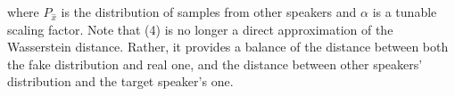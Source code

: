where $P_{\hat{x}}$ is the distribution of samples from other speakers and
$\alpha$ is a tunable scaling factor. Note that (4) is no longer a direct approximation of the Wasserstein distance. Rather, it provides a balance of the distance between both the fake distribution and real one, and the distance between other speakers' distribution and the target speaker's one.  